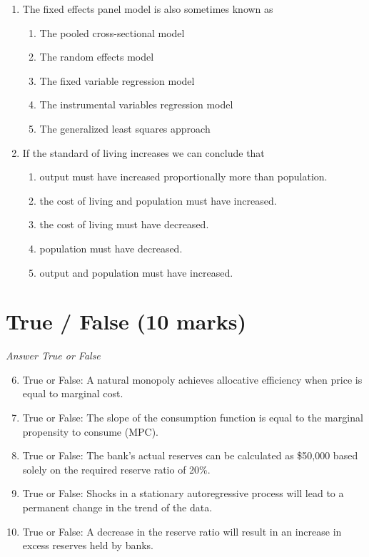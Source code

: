 \documentclass[12pt]{article}
\begin{document}
\begin{enumerate}[label=\arabic*.]
\item The fixed effects panel model is also sometimes known as
\begin{enumerate}[label=(\alph*)]
    \item The pooled cross-sectional model
    \item The random effects model
    \item The fixed variable regression model
    \item The instrumental variables regression model
    \item The generalized least squares approach
\end{enumerate}
\item If the standard of living increases we can conclude that
\begin{enumerate}[label=(\alph*)]
    \item output must have increased proportionally more than population.
    \item the cost of living and population must have increased.
    \item the cost of living must have decreased.
    \item population must have decreased.
    \item output and population must have increased.
\end{enumerate}
\end{enumerate}

\section*{True / False (10 marks)}
\textit{Answer True or False}
\begin{enumerate}[label=\arabic*.]
\setcounter{enumi}{5}
\item True or False: A natural monopoly achieves allocative efficiency when price is equal to marginal cost.
\item True or False: The slope of the consumption function is equal to the marginal propensity to consume (MPC).
\item True or False: The bank's actual reserves can be calculated as \$50,000 based solely on the required reserve ratio of 20\%.
\item True or False: Shocks in a stationary autoregressive process will lead to a permanent change in the trend of the data.
\item True or False: A decrease in the reserve ratio will result in an increase in excess reserves held by banks.
\end{enumerate}
\end{document}
